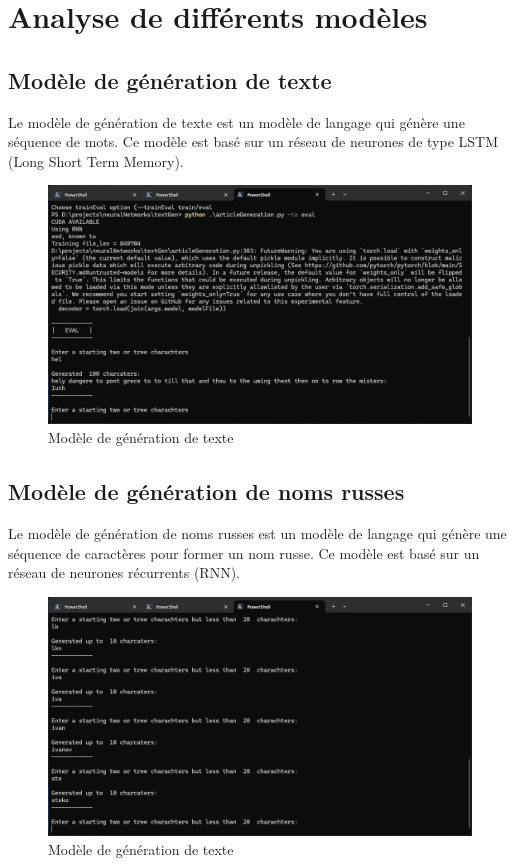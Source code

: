 \section{Analyse de différents modèles}

\subsection{Modèle de génération de texte}
Le modèle de génération de texte est un modèle de langage qui génère une séquence de mots. Ce modèle est basé sur un réseau de neurones de type LSTM (Long Short Term Memory).
\begin{figure}[H]
    \centering
    \includegraphics[width=.8\textwidth]{figures/shakespeare.png}
    \caption{Modèle de génération de texte}
    \label{fig:shakespeare}
\end{figure}

\subsection{Modèle de génération de noms russes}
Le modèle de génération de noms russes est un modèle de langage qui génère une séquence de caractères pour former un nom russe. Ce modèle est basé sur un réseau de neurones récurrents (RNN).
\begin{figure}[H]
    \centering
    \includegraphics[width=.8\textwidth]{figures/russian.png}
    \caption{Modèle de génération de texte}
    \label{fig:russian}
\end{figure}

